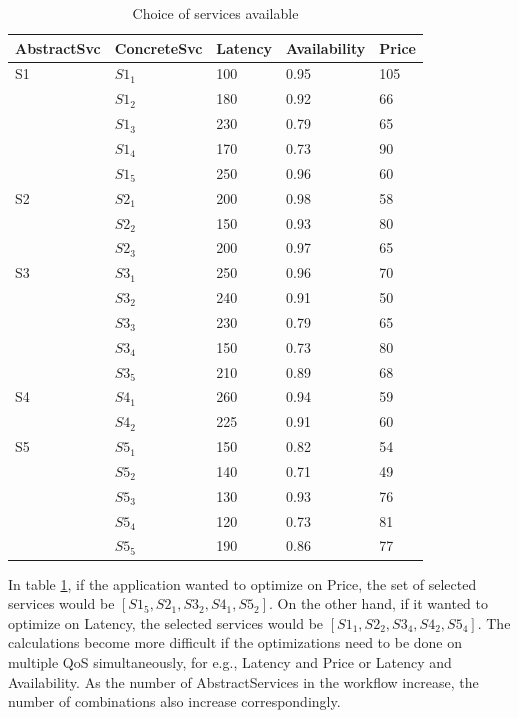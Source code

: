 \documentclass[10pt,journal,compsoc]{IEEEtran}
\begin{document}
 \begin{table} \footnotesize
	\centering
	\begin{tabular}{lllll}
\toprule
   \small{\textbf{AbstractSvc}} &   \textbf{ConcreteSvc} &   \textbf{Latency} &   \textbf{Availability} &   \textbf{Price}\\ 
\midrule
S1 
 & $S1_{1}$ & 100 & 0.95 & 105\\
 & $S1_{2}$ & 180 & 0.92 & 66\\
 & $S1_{3}$ & 230 & 0.79 & 65\\
 & $S1_{4}$ & 170 & 0.73 & 90\\
 & $S1_{5}$ & 250 & 0.96 & 60\\ 

S2 
 & $S2_{1}$ & 200 & 0.98 & 58\\
 & $S2_{2}$ & 150 & 0.93 & 80\\
 & $S2_{3}$ & 200 & 0.97 & 65\\ 
 

S3
 & $S3_{1}$ & 250 & 0.96 & 70\\
 & $S3_{2}$ & 240 & 0.91 & 50\\
 & $S3_{3}$ & 230 & 0.79 & 65\\ 
 & $S3_{4}$ & 150 & 0.73 & 80\\
 & $S3_{5}$ & 210 & 0.89 & 68\\ 

S4
 & $S4_{1}$ & 260 & 0.94 & 59\\
 & $S4_{2}$ & 225 & 0.91 & 60\\

S5
 & $S5_{1}$ & 150 & 0.82 & 54\\
 & $S5_{2}$ & 140 & 0.71 & 49\\
 & $S5_{3}$ & 130 & 0.93 & 76\\ 
 & $S5_{4}$ & 120 & 0.73 & 81\\
 & $S5_{5}$ & 190 & 0.86 & 77\\ 

\bottomrule

\end{tabular}
\caption{Choice of services available \label{tbl:choice-of-services}}
\end{table} 
 

 In table \ref{tbl:choice-of-services}, if the application wanted to optimize on Price, the set of selected services would be $[S1_{5}, S2_{1}, S3_{2}, S4_{1}, S5_{2}]$. On the other hand, if it wanted to optimize on Latency, the selected services would be $[S1_{1}, S2_{2}, S3_{4}, S4_{2}, S5_{4}]$. The calculations become more difficult if the optimizations need to be done on multiple QoS simultaneously, for e.g., Latency and Price or Latency and Availability. As the number of AbstractServices in the workflow increase, the number of combinations also increase correspondingly.
\end{document}
